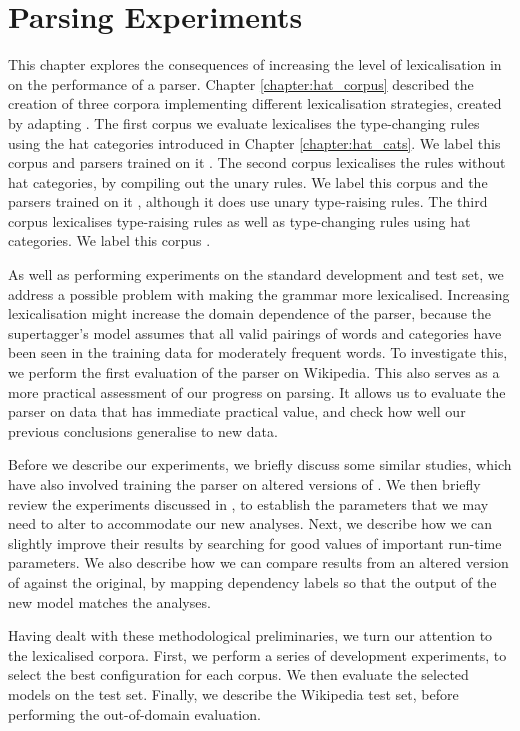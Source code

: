 \chapter{Parsing Experiments}
\label{chapter:results}

This chapter explores the consequences of increasing the level of lexicalisation
in \ccgbank on the performance of a \ccg parser. Chapter
\ref{chapter:hat_corpus} described the creation of three corpora implementing
different lexicalisation strategies, created by adapting \ccgbank. The first
corpus we evaluate lexicalises the \ccgbank type-changing rules using the hat
categories introduced in Chapter \ref{chapter:hat_cats}. We label this corpus
and parsers trained on it \hatsys. The second corpus lexicalises the rules
without hat categories, by compiling out the unary rules. We label this corpus
and the parsers trained on it \nounary, although it does use unary type-raising
rules. The third corpus lexicalises type-raising rules as well as
type-changing rules using hat categories. We label this corpus \trsys.

As well as performing experiments on the standard development and test set, we
address a possible problem with making the grammar more lexicalised. Increasing
lexicalisation might increase the domain dependence of the parser, because the
supertagger's model assumes that all valid pairings of words and categories have
been seen in the training data for moderately frequent words. To investigate
this, we perform the first evaluation of the \candc parser on Wikipedia. This
also serves as a more practical assessment of our progress on \ccg parsing. It
allows us to evaluate the parser on data that has immediate practical value, and
check how well our previous conclusions generalise to new data.

Before we describe our experiments, we briefly discuss some similar studies,
which have also involved training the \candc parser on altered versions of
\ccgbank. We then briefly review the experiments discussed in
\citet{clark:cl07}, to establish the parameters that we may need to alter to
accommodate our new analyses. Next, we describe how we can slightly improve their
results by searching for good values of important run-time parameters. We also
describe how we can compare results from an altered version of \ccgbank against
the original, by mapping dependency labels so that the output of the new model
matches the \ccgbank analyses.

Having dealt with these methodological preliminaries, we turn our attention to
the lexicalised corpora. First, we perform a series of development experiments,
to select the best configuration for each corpus. We then evaluate the selected
models on the \wsj test set. Finally, we describe the Wikipedia test set, before
performing the out-of-domain evaluation.


